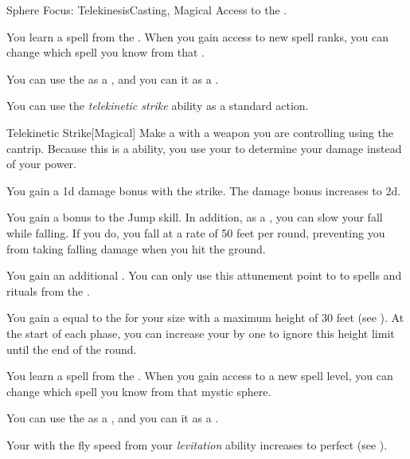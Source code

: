     \begin{feat}{Sphere Focus: Telekinesis}{Casting, Magical}
        \featpre Access to the  .

         You learn a spell from the  .
        When you gain access to new spell ranks, you can change which spell you know from that .

         You can use the   as a , and you can  it as a .

         You can use the \textit{telekinetic strike} ability as a standard action.
        \begin{freeability}{Telekinetic Strike}[Magical]
            Make a  with a weapon you are controlling using the  cantrip.
            Because this is a  ability, you use your   to determine your damage instead of your  power.

            \rankline
             You gain a \plus1d damage bonus with the strike.
             The damage bonus increases to \plus2d.
        \end{freeability}

         You gain a  bonus to the Jump skill.
        In addition, as a , you can slow your fall while falling.
        If you do, you fall at a rate of 50 feet per round, preventing you from taking falling damage when you hit the ground.

         You gain an additional .
        You can only use this attunement point to  to spells and rituals from the  .

         You gain a  equal to the  for your size with a maximum height of 30 feet (see ).
        At the start of each phase, you can increase your  by one to ignore this height limit until the end of the round.

         You learn a spell from the  .
        When you gain access to a new spell level, you can change which spell you know from that mystic sphere.

         You can use the   as a , and you can  it as a .

         Your  with the fly speed from your \textit{levitation} ability increases to perfect (see ).
    \end{feat}

